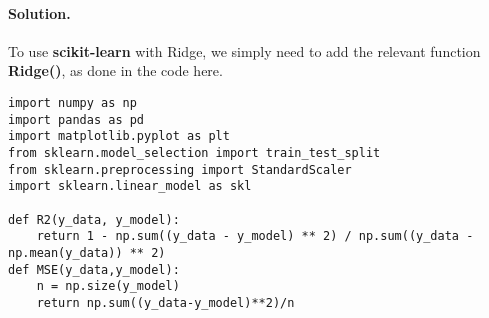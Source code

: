 \documentclass[%
oneside,                 %
final,                   %
10pt]{article}
\newenvironment{doconceexercise}{}{}
\begin{document}
\begin{doconceexercise}
\paragraph{Solution.}
To use \textbf{scikit-learn} with Ridge, we simply need to add the relevant function \textbf{Ridge()}, as done in the code here.
















































































\begin{verbatim}
import numpy as np
import pandas as pd
import matplotlib.pyplot as plt
from sklearn.model_selection import train_test_split
from sklearn.preprocessing import StandardScaler
import sklearn.linear_model as skl

def R2(y_data, y_model):
    return 1 - np.sum((y_data - y_model) ** 2) / np.sum((y_data - np.mean(y_data)) ** 2)
def MSE(y_data,y_model):
    n = np.size(y_model)
    return np.sum((y_data-y_model)**2)/n



\end{verbatim}
\end{doconceexercise}
\end{document}
